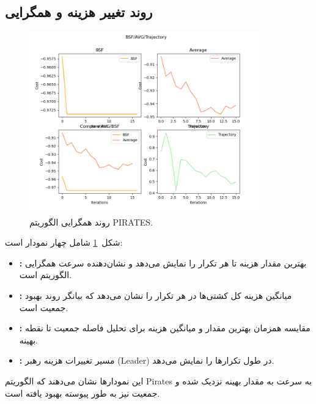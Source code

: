 \subsection{روند تغییر هزینه و همگرایی}
\begin{figure}[h!]
    \centering
    \includegraphics[width=0.9\textwidth]{images/pirates_bsf_avg_trajectory.png}
    \caption{روند همگرایی الگوریتم PIRATES.}
    \label{fig:pirates_bsf_avg_trajectory}
\end{figure}

شکل~\ref{fig:pirates_bsf_avg_trajectory} شامل چهار نمودار است:
\begin{itemize}
    \item \textbf{:} بهترین مقدار هزینه تا هر تکرار را نمایش می‌دهد و نشان‌دهنده سرعت همگرایی الگوریتم است.
    \item \textbf{:} میانگین هزینه کل کشتی‌ها در هر تکرار را نشان می‌دهد که بیانگر روند بهبود جمعیت است.
    \item \textbf{:} مقایسه همزمان بهترین مقدار و میانگین هزینه برای تحلیل فاصله جمعیت تا نقطه بهینه.
    \item \textbf{:} مسیر تغییرات هزینه رهبر (Leader) در طول تکرارها را نمایش می‌دهد.
\end{itemize}
این نمودارها نشان می‌دهند که الگوریتم Pirates به سرعت به مقدار بهینه نزدیک شده و جمعیت نیز به طور پیوسته بهبود یافته است.

